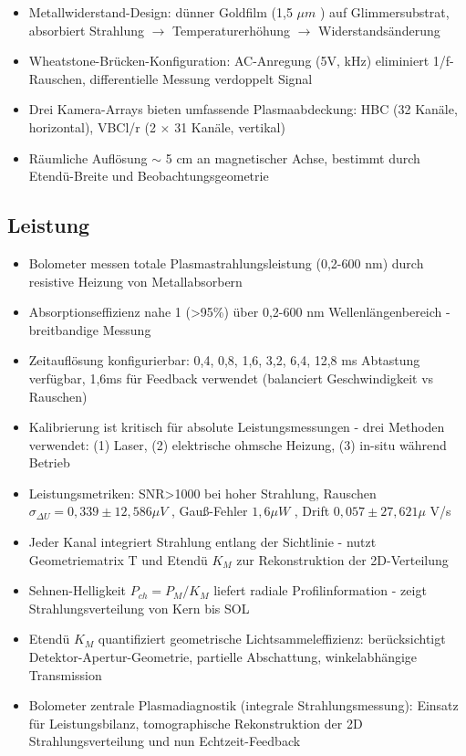 \documentclass[11pt,a4paper]{article}
\begin{document}
\begin{itemize}
\item Metallwiderstand-Design: dünner Goldfilm (1,5 $\mu m $ ) auf Glimmersubstrat, absorbiert Strahlung $\rightarrow $ Temperaturerhöhung $\rightarrow $ Widerstandsänderung
\item Wheatstone-Brücken-Konfiguration: AC-Anregung (5V, kHz) eliminiert 1/f-Rauschen, differentielle Messung verdoppelt Signal
\item Drei Kamera-Arrays bieten umfassende Plasmaabdeckung: HBC (32 Kanäle, horizontal), VBCl/r (2 $\times $ 31 Kanäle, vertikal)
\item Räumliche Auflösung $\sim $ 5 cm an magnetischer Achse, bestimmt durch Etendü-Breite und Beobachtungsgeometrie

\end{itemize}

\subsection{Leistung}

\begin{itemize}
\item Bolometer messen totale Plasmastrahlungsleistung (0,2-600 nm) durch resistive Heizung von Metallabsorbern
\item Absorptionseffizienz nahe 1 (>95\%) über 0,2-600 nm Wellenlängenbereich - breitbandige Messung
\item Zeitauflösung konfigurierbar: {0,4, 0,8, 1,6, 3,2, 6,4, 12,8} ms Abtastung verfügbar, 1,6ms für Feedback verwendet (balanciert Geschwindigkeit vs Rauschen)
\item Kalibrierung ist kritisch für absolute Leistungsmessungen - drei Methoden verwendet: (1) Laser, (2) elektrische ohmsche Heizung, (3) in-situ während Betrieb
\item Leistungsmetriken: SNR>1000 bei hoher Strahlung, Rauschen $\sigma_{\Delta U}=0,339 \pm 12,586 \mu V $ , Gauß-Fehler $ 1,6 \mu W $ , Drift $ 0,057 \pm 27,621 \mu $ V/s
\item Jeder Kanal integriert Strahlung entlang der Sichtlinie - nutzt Geometriematrix T und Etendü $ K_M $ zur Rekonstruktion der 2D-Verteilung
\item Sehnen-Helligkeit $ P_{ch} = P_M/K_M $ liefert radiale Profilinformation - zeigt Strahlungsverteilung von Kern bis SOL
\item Etendü $ K_M $ quantifiziert geometrische Lichtsammeleffizienz: berücksichtigt Detektor-Apertur-Geometrie, partielle Abschattung, winkelabhängige Transmission
\item Bolometer zentrale Plasmadiagnostik (integrale Strahlungsmessung): Einsatz für Leistungsbilanz, tomographische Rekonstruktion der 2D Strahlungsverteilung und nun Echtzeit-Feedback

\color{ipp}{
  \item Kalibrierungsparameter (OP1.2b Median): $R_M=0,987\pm0,011\,$k$\Omega$, $\kappa_M=0,724\pm0,055\,A^2$, $\tau_M=110,57 \pm$4,93\,ms, bemerkenswert stabil über 1182 Experimente
}
\end{itemize}
\end{document}
